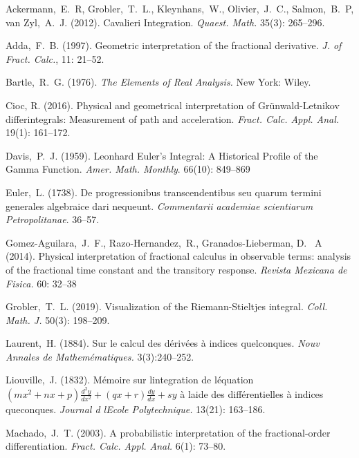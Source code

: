 \documentclass{article}
\theoremstyle{theorem}
\theoremstyle{definition}
\begin{document}
\begin{thebibliography}{1}

 Ackermann,~E.~R, Grobler,~T.~L., Kleynhans,~W., Olivier,~J.~C., Salmon,~B.~P, van Zyl,~A.~J. (2012). Cavalieri
Integration. \textit{Quaest. Math.} 35(3): 265–296.

 Adda,~F.~B. (1997). Geometric interpretation of the fractional derivative. \textit{J. of Fract. Calc.}, 11: 21--52.

 Bartle,~R.~G. (1976). \textit{The Elements of Real Analysis.} New York: Wiley.

 Cioc, R. (2016). Physical and geometrical interpretation of Gr\"{u}nwald-Letnikov differintegrals: Measurement of path and acceleration. \textit{Fract. Calc. Appl. Anal.} 19(1): 161--172.

 Davis,~P.~J. (1959). Leonhard Euler's Integral: A Historical Profile of the Gamma Function. \textit{Amer. Math. Monthly}. 66(10): 849--869

 Euler,~L. (1738). De progressionibus transcendentibus seu quarum termini generales algebraice dari nequeunt. \textit{Commentarii academiae scientiarum Petropolitanae}. 36--57.

 Gomez-Aguilara,~J.~F., Razo-Hernandez,~R., Granados-Lieberman, D.~ A (2014). Physical interpretation of fractional
calculus in observable terms: analysis of the fractional time constant and the transitory response. \textit{Revista Mexicana de Fisica.} 60: 32--38

 Grobler,~T.~L. (2019). Visualization of the Riemann-Stieltjes integral. \textit{Coll. Math. J.} 50(3): 198--209.

 Laurent,~H. (1884). Sur le calcul des d\'{e}riv\'{e}es \`{a} indices quelconques. \textit{Nouv Annales de Mathem\'{e}matiques.} 3(3):240--252. 

 Liouville,~J. (1832). M\'{e}moire sur l\textquotesingle integration de l\textquotesingle \'{e}quation $(mx^2+nx+p)\frac{d^2y}{dx^2}+(qx+r)\frac{dy}{dx}+sy$ \`{a} l\textquotesingle aide des diff\'{e}rentielles \`{a} indices 
que\textquotesingle conques. \textit{Journal d l\textquotesingle Ecole Polytechnique.} 13(21): 163--186. 

 Machado,~J.~T. (2003). A probabilistic interpretation of the fractional-order differentiation. \textit{Fract. Calc. Appl. Anal.} 6(1): 73--80.


\end{thebibliography}
\end{document}
